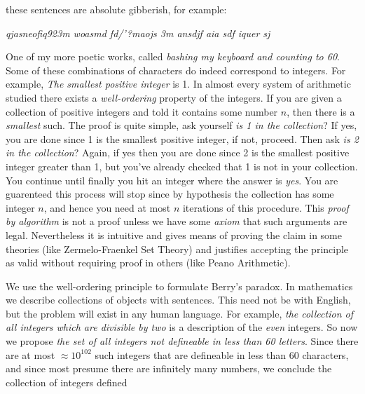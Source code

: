         these sentences are absolute gibberish, for example:
        \begin{center}
            \textit{qjasneofiq923m woasmd fd/'?maojs 3m ansdjf aia sdf iquer sj}
        \end{center}
        One of my more poetic works, called
        \textit{bashing my keyboard and counting to 60}. Some of these
        combinations of characters do indeed correspond to integers. For
        example, \textit{The smallest positive integer} is 1. In almost every
        system of arithmetic studied there exists a \textit{well-ordering}%
         property of the integers. If you are given a
        collection of positive integers and told it contains some number $n$,
        then there is a \textit{smallest} such. The proof is quite simple, ask
        yourself \textit{is 1 in the collection}? If yes, you are done since 1
        is the smallest positive integer, if not, proceed. Then ask
        \textit{is 2 in the collection}? Again, if yes then you are done since
        2 is the smallest positive integer greater than 1, but you've already
        checked that 1 is not in your collection. You continue until finally you
        hit an integer where the answer is \textit{yes}. You are guarenteed this
        process will stop since by hypothesis the collection has some integer
        $n$, and hence you need at most $n$ iterations of this procedure. This
        \textit{proof by algorithm} is not a proof unless we have some
        \textit{axiom} that such arguments are legal. Nevertheless it is
        intuitive and gives means of proving the claim in some theories (like
        Zermelo-Fraenkel Set Theory) and justifies accepting the principle as
        valid without requiring proof in others (like Peano Arithmetic).
        \par\hfill\par
        We use the well-ordering principle to formulate Berry's paradox. In
        mathematics we describe collections of objects with sentences. This need
        not be with English, but the problem will exist in any human language.
        For example,
        \textit{the collection of all integers which are divisible by two} is a
        description of the \textit{even} integers. So now we propose
        \textit{the set of all integers not defineable in less than 60 letters}.
        Since there are at most $\approx{10}^{102}$ such integers that are
        defineable in less than 60 characters, and since most presume there are
        infinitely many numbers, we conclude the collection of integers defined
